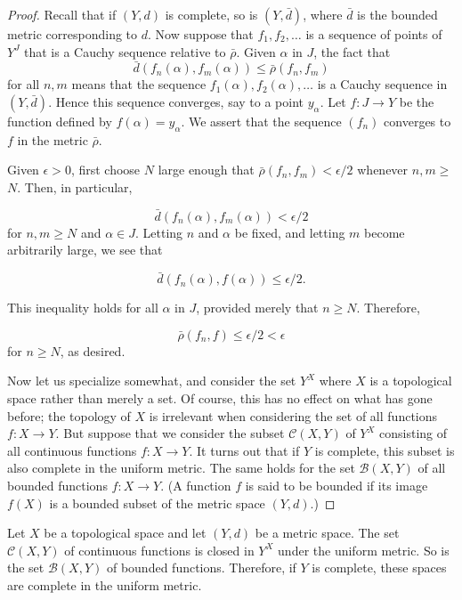 \begin{proof}
Recall that if \((Y, d)\) is complete, so is \(({Y,\bar{d}})\), where \(\bar{d}\) is the bounded metric corresponding to \(d\). Now suppose that \(f_{1},f_{2},\ldots\) is a sequence of points of \(Y^{J}\) that is a Cauchy sequence relative to \(\bar{\rho }\). Given \(\alpha\) in \(J\), the fact that
\[
\bar{d}({f_{n}( \alpha ),f_{m}( \alpha ) }) \leq \bar{\rho }({f_{n},f_{m}})
\]
for all \(n,m\) means that the sequence \(f_{1}( \alpha ),f_{2}( \alpha ),\ldots\) is a Cauchy sequence in \(({Y,\bar{d}})\). Hence this sequence converges, say to a point \(y_{\alpha }\). Let \(f : J \rightarrow Y\) be the function defined by \(f( \alpha ) = y_{\alpha }\). We assert that the sequence \((f_{n})\) converges to \(f\) in the metric \(\bar{\rho }\).

Given \(\epsilon > 0\), first choose \(N\) large enough that \(\bar{\rho }({f_{n},f_{m}}) < \epsilon /2\) whenever \(n,m \geq\) \(N\). Then, in particular,

\[
\bar{d}({f_{n}( \alpha ),f_{m}( \alpha ) }) < \epsilon /2
\]
for \(n,m \geq N\) and \(\alpha \in J\). Letting \(n\) and \(\alpha\) be fixed, and letting \(m\) become arbitrarily large, we see that

\[
\bar{d}({f_{n}( \alpha ),f( \alpha ) }) \leq \epsilon /2.
\]

This inequality holds for all \(\alpha\) in \(J\), provided merely that \(n \geq N\). Therefore,

\[
\bar{\rho }({f_{n},f}) \leq \epsilon /2 < \epsilon
\]
for \(n \geq N\), as desired.

Now let us specialize somewhat, and consider the set \(Y^{X}\) where \(X\) is a topological space rather than merely a set. Of course, this has no effect on what has gone before; the topology of \(X\) is irrelevant when considering the set of all functions \(f : X \rightarrow Y\). But suppose that we consider the subset \(\mathcal{C}({X,Y})\) of \(Y^{X}\) consisting of all continuous functions \(f : X \rightarrow Y\). It turns out that if \(Y\) is complete, this subset is also complete in the uniform metric. The same holds for the set \(\mathcal{B}({X,Y})\) of all bounded functions \(f : X \rightarrow Y\). (A function \(f\) is said to be bounded if its image \(f(X)\) is a bounded subset of the metric space \((Y, d)\).)
\end{proof}
\begin{theorem}
\label{thm:\thetheorem}
Let \(X\) be a topological space and let \((Y, d)\) be a metric space. The set \(\mathcal{C}({X,Y})\) of continuous functions is closed in \(Y^{X}\) under the uniform metric. So is the set \(\mathcal{B}({X,Y})\) of bounded functions. Therefore, if \(Y\) is complete, these spaces are complete in the uniform metric.
\end{theorem}

